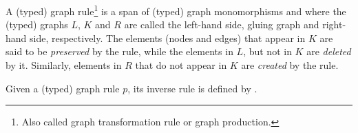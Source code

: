 \begin{example}
\end{example}
\fi

\begin{definition}\label{def:graph-rule} A (typed) graph rule\footnote{Also called graph transformation rule or graph production.} \graphrule{} is a span of (typed) graph monomorphisms \lefthand{} and \righthand{}  where the (typed) graphs $L$, $K$ and $R$ are called the left-hand side, gluing graph and right-hand side, respectively. The elements (nodes and edges) that appear in $K$ are said to be \emph{preserved} by the rule, while the elements in $L$, but not in $K$ are
  \emph{deleted} by it. Similarly, elements in $R$ that do not appear in $K$ are \emph{created} by the rule.

  Given a (typed) graph rule $p$, its inverse rule is defined by \inversegraphrule.
\end{definition}

